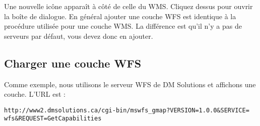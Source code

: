 Une nouvelle icône  apparaît à côté de celle du WMS. Cliquez dessus pour ouvrir la boîte de dialogue. En général ajouter une couche WFS est identique à la procédure utilisée pour une couche WMS. La différence est qu'il n'y a pas de serveurs par défaut, vous devez donc en ajouter.

\subsection{Charger une couche WFS}

Comme exemple, nous utilisons le serveur WFS de DM Solutions et affichons une
couche. L'URL est :
\begin{verbatim}
http://www2.dmsolutions.ca/cgi-bin/mswfs_gmap?VERSION=1.0.0&SERVICE=
wfs&REQUEST=GetCapabilities
\end{verbatim}


